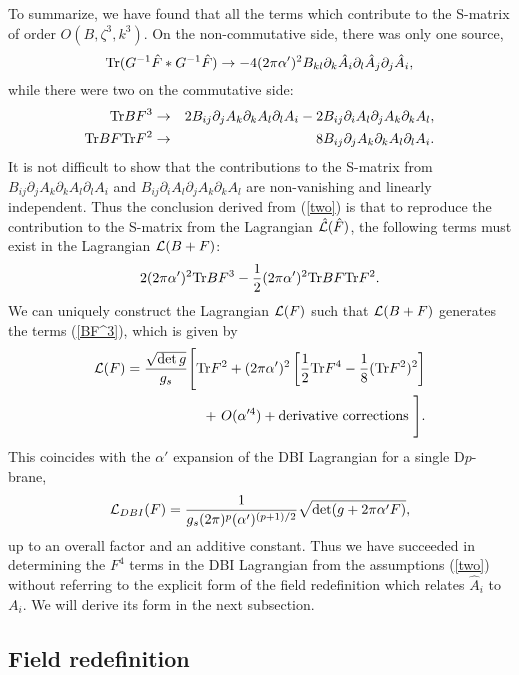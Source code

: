 \documentclass[a4paper,12pt]{article}
\begin{document}
To summarize, we have found that all the terms which contribute
to the S-matrix of order $O(B, \zeta^3, k^3)$.
On the non-commutative side, there was only one source,
$$
{\rm Tr} ( G^{-1} \hat{F} \ast G^{-1} \hat{F} ) \to
-4 (2 \pi \alpha')^2 B_{kl}
\partial_k \hat{A}_i \partial_l \hat{A}_j \partial_j \hat{A}_i,
$$
while there were two on the commutative side:
\begin{eqnarray*}
{\rm Tr} BF^3 &\to&
 2 B_{ij} \partial_j A_k \partial_k A_l \partial_l A_i
-2 B_{ij} \partial_i A_l \partial_j A_k \partial_k A_l,
\\
{\rm Tr} BF {\rm Tr} F^2 &\to&
8 B_{ij} \partial_j A_k \partial_k A_l \partial_l A_i.
\end{eqnarray*}
It is not difficult to show that
the contributions to the S-matrix from
$B_{ij} \partial_j A_k \partial_k A_l \partial_l A_i$
and $B_{ij} \partial_i A_l \partial_j A_k \partial_k A_l$
are non-vanishing and linearly independent.
Thus the conclusion derived from (\ref{two}) is that
to reproduce the contribution to the S-matrix from
the Lagrangian $\hat{{\cal L}} (\hat{F})$,
the following terms must exist
in the Lagrangian ${\cal L} (B+F)$:
\begin{equation}
2 (2 \pi \alpha')^2 {\rm Tr} BF^3
-\frac{1}{2} (2 \pi \alpha')^2 {\rm Tr} BF {\rm Tr} F^2.
\label{BF^3}
\end{equation}
We can uniquely construct the Lagrangian ${\cal L} (F)$
such that ${\cal L} (B+F)$ generates the terms (\ref{BF^3}),
which is given by
\begin{eqnarray}
{\cal L}(F) = \frac{\sqrt{\det g}}{g_s} \Biggl[
{\rm Tr} F^2
+ (2 \pi \alpha')^2 \left[
\frac{1}{2} {\rm Tr} F^4
-\frac{1}{8} ({\rm Tr} F^2)^2 \right]
\nonumber \\
+ ~O(\alpha'^4) + {\rm derivative~corrections~}
\Biggr].
\end{eqnarray}
This coincides with the $\alpha'$ expansion of
the DBI Lagrangian for a single D$p$-brane,
\begin{equation}
{\cal L}_{DBI} (F) =
\frac{1}{g_s (2 \pi)^p (\alpha')^{(p+1)/2}}
\sqrt{\det (g + 2 \pi \alpha' F)},
\label{DBI}
\end{equation}
up to an overall factor and an additive constant.
Thus we have succeeded in determining the $F^4$ terms
in the DBI Lagrangian from the assumptions (\ref{two})
without referring to the explicit form of the field redefinition
which relates $\hat{A}_i$ to $A_i$.
We will derive its form in the next subsection.

\subsection{Field redefinition}
\indent
\end{document}

